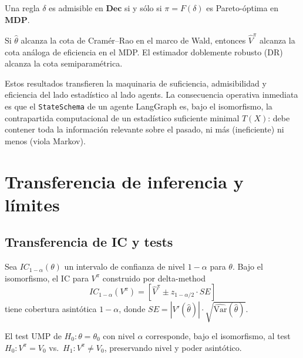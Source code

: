 \documentclass[11pt,a4paper]{article}
\theoremstyle{mitheorem}
\theoremstyle{mitdef}
\newcommand{\Value}{V}
\newcommand{\decrule}{\delta}
\newcommand{\policy}{\pi}
\begin{document}
\begin{tcolorbox}[mitthmstyle, title={Teorema 9.9 — Preservación de Admisibilidad}]
Una regla $\decrule$ es admisible en $\mathbf{Dec}$ si y sólo si
$\policy = F(\decrule)$ es Pareto-óptima en $\mathbf{MDP}$.
\end{tcolorbox}

\begin{tcolorbox}[mitthmstyle, title={Teorema 9.11 — Preservación de Eficiencia}]
Si $\hat\theta$ alcanza la cota de Cramér--Rao en el marco de Wald, entonces
$\hat{\Value}^\policy$ alcanza la cota análoga de eficiencia en el MDP. El
estimador doblemente robusto (DR) alcanza la cota semiparamétrica.
\end{tcolorbox}

Estos resultados transfieren la maquinaria de suficiencia, admisibilidad
y eficiencia del lado estadístico al lado agents. La consecuencia
operativa inmediata es que el \texttt{StateSchema} de un agente
LangGraph es, bajo el isomorfismo, la contrapartida computacional de un
estadístico suficiente minimal $T(X)$: debe contener toda la
información relevante sobre el pasado, ni más (ineficiente) ni menos
(viola Markov).

\section{Transferencia de inferencia y límites}
\label{sec:limites}

\subsection{Transferencia de IC y tests}

\begin{tcolorbox}[mitthmstyle, title={Teorema 9.7 — Transferencia de Intervalos de Confianza}]
Sea $IC_{1-\alpha}(\theta)$ un intervalo de confianza de nivel $1-\alpha$ para
$\theta$. Bajo el isomorfismo, el IC para $\Value^\policy$ construido por
delta-method
\[
  IC_{1-\alpha}(\Value^\policy) = \left[\hat{\Value}^\policy \pm z_{1-\alpha/2}\cdot SE\right]
\]
tiene cobertura asintótica $1-\alpha$, donde $SE = |V'(\hat\theta)|\cdot\sqrt{\widehat{\mathrm{Var}}(\hat\theta)}$.
\end{tcolorbox}

\begin{tcolorbox}[mitthmstyle, title={Teorema 9.8 — Transferencia de Tests}]
El test UMP de $H_0:\theta=\theta_0$ con nivel $\alpha$ corresponde, bajo el
isomorfismo, al test $H_0:\Value^\policy=\Value_0$ vs.\ $H_1:\Value^\policy\neq\Value_0$,
preservando nivel y poder asintótico.
\end{tcolorbox}
\end{document}
